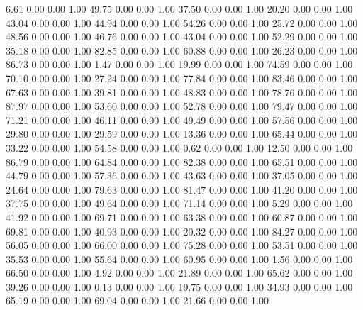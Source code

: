     6.61   0.00   0.00   1.00
   49.75   0.00   0.00   1.00
   37.50   0.00   0.00   1.00
   20.20   0.00   0.00   1.00
   43.04   0.00   0.00   1.00
   44.94   0.00   0.00   1.00
   54.26   0.00   0.00   1.00
   25.72   0.00   0.00   1.00
   48.56   0.00   0.00   1.00
   46.76   0.00   0.00   1.00
   43.04   0.00   0.00   1.00
   52.29   0.00   0.00   1.00
   35.18   0.00   0.00   1.00
   82.85   0.00   0.00   1.00
   60.88   0.00   0.00   1.00
   26.23   0.00   0.00   1.00
   86.73   0.00   0.00   1.00
    1.47   0.00   0.00   1.00
   19.99   0.00   0.00   1.00
   74.59   0.00   0.00   1.00
   70.10   0.00   0.00   1.00
   27.24   0.00   0.00   1.00
   77.84   0.00   0.00   1.00
   83.46   0.00   0.00   1.00
   67.63   0.00   0.00   1.00
   39.81   0.00   0.00   1.00
   48.83   0.00   0.00   1.00
   78.76   0.00   0.00   1.00
   87.97   0.00   0.00   1.00
   53.60   0.00   0.00   1.00
   52.78   0.00   0.00   1.00
   79.47   0.00   0.00   1.00
   71.21   0.00   0.00   1.00
   46.11   0.00   0.00   1.00
   49.49   0.00   0.00   1.00
   57.56   0.00   0.00   1.00
   29.80   0.00   0.00   1.00
   29.59   0.00   0.00   1.00
   13.36   0.00   0.00   1.00
   65.44   0.00   0.00   1.00
   33.22   0.00   0.00   1.00
   54.58   0.00   0.00   1.00
    0.62   0.00   0.00   1.00
   12.50   0.00   0.00   1.00
   86.79   0.00   0.00   1.00
   64.84   0.00   0.00   1.00
   82.38   0.00   0.00   1.00
   65.51   0.00   0.00   1.00
   44.79   0.00   0.00   1.00
   57.36   0.00   0.00   1.00
   43.63   0.00   0.00   1.00
   37.05   0.00   0.00   1.00
   24.64   0.00   0.00   1.00
   79.63   0.00   0.00   1.00
   81.47   0.00   0.00   1.00
   41.20   0.00   0.00   1.00
   37.75   0.00   0.00   1.00
   49.64   0.00   0.00   1.00
   71.14   0.00   0.00   1.00
    5.29   0.00   0.00   1.00
   41.92   0.00   0.00   1.00
   69.71   0.00   0.00   1.00
   63.38   0.00   0.00   1.00
   60.87   0.00   0.00   1.00
   69.81   0.00   0.00   1.00
   40.93   0.00   0.00   1.00
   20.32   0.00   0.00   1.00
   84.27   0.00   0.00   1.00
   56.05   0.00   0.00   1.00
   66.00   0.00   0.00   1.00
   75.28   0.00   0.00   1.00
   53.51   0.00   0.00   1.00
   35.53   0.00   0.00   1.00
   55.64   0.00   0.00   1.00
   60.95   0.00   0.00   1.00
    1.56   0.00   0.00   1.00
   66.50   0.00   0.00   1.00
    4.92   0.00   0.00   1.00
   21.89   0.00   0.00   1.00
   65.62   0.00   0.00   1.00
   39.26   0.00   0.00   1.00
    0.13   0.00   0.00   1.00
   19.75   0.00   0.00   1.00
   34.93   0.00   0.00   1.00
   65.19   0.00   0.00   1.00
   69.04   0.00   0.00   1.00
   21.66   0.00   0.00   1.00

